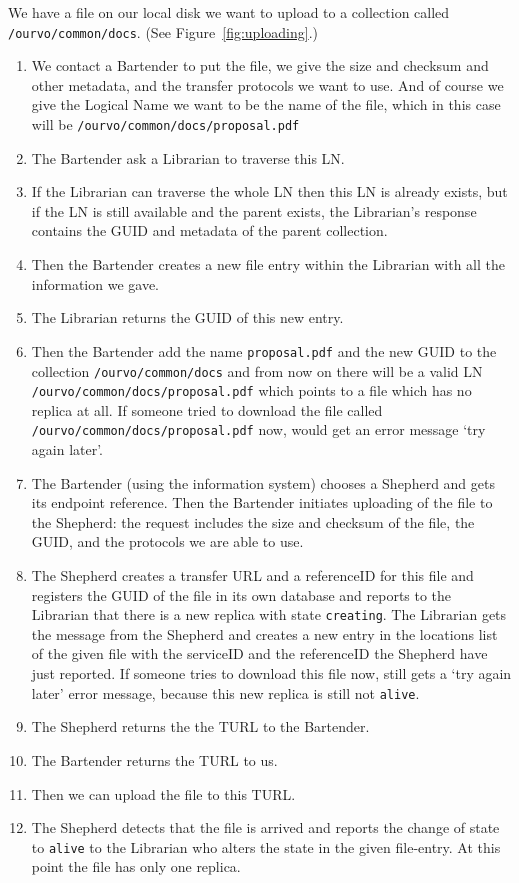 \documentclass{book}
\begin{document}
We have a file on our local disk we want to upload to a collection called \verb#/ourvo/common/docs#. (See Figure~\ref{fig:uploading}.)
\begin{enumerate}
\item We contact a Bartender to put the file, we give the size and checksum and other metadata, and the transfer protocols we want to use. And of course we give the Logical Name we want to be the name of the file, which in this case will be \verb#/ourvo/common/docs/proposal.pdf#
\item The Bartender ask a Librarian to traverse this LN.
\item If the Librarian can traverse the whole LN then this LN is already exists, but if the LN is still available and the parent exists, the Librarian’s response contains the GUID and metadata of the parent collection.
\item Then the Bartender creates a new file entry within the Librarian with all the information we gave. 
\item The Librarian returns the GUID of this new entry.
\item Then the Bartender add the name \verb#proposal.pdf# and the new GUID to the collection \verb#/ourvo/common/docs# and from now on there will be a valid LN \verb#/ourvo/common/docs/proposal.pdf# which points to a file which has no replica at all. If someone tried to download the file called \verb#/ourvo/common/docs/proposal.pdf# now, would get an error message `try again later'.
\item The Bartender (using the information system) chooses a Shepherd and gets its endpoint reference. Then the Bartender initiates uploading of the file to the Shepherd: the request includes the size and checksum of the file, the GUID, and the protocols we are able to use.
\item The Shepherd creates a transfer URL and a referenceID for this file and registers the GUID of the file in its own database and reports to the Librarian that there is a new replica with state \verb#creating#. The Librarian gets the message from the Shepherd and creates a new entry in the locations list of the given file with the serviceID and the referenceID the Shepherd have just reported. If someone tries to download this file now, still gets a `try again later' error message, because this new replica is still not \verb#alive#.
\item The Shepherd returns the the TURL to the Bartender.
\item The Bartender returns the TURL to us.
\item Then we can upload the file to this TURL.
\item The Shepherd detects that the file is arrived and reports the change of state to \verb#alive# to the  Librarian who alters the state in the given file-entry. At this point the file has only one replica. 
\end{enumerate}
\end{document}
